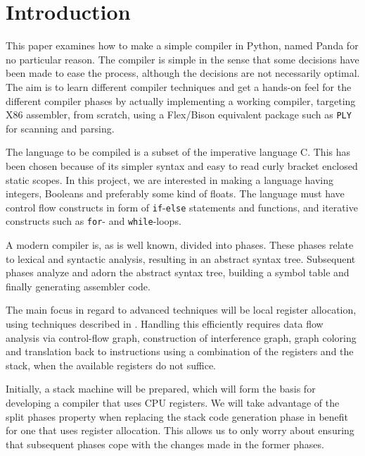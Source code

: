 { \hypersetup{hidelinks} \tableofcontents }

\newpage
{}
\setcounter{page}{1}

\chapter{Introduction}
This paper examines how to make a simple compiler in Python, named Panda for no particular reason. The compiler is simple in the sense that some decisions have been made to ease the process, although the decisions are not necessarily optimal. The aim is to learn different compiler techniques and get a hands-on feel for the different compiler phases by actually implementing a working compiler, targeting X86 assembler, from scratch, using a Flex/Bison equivalent package such as \texttt{PLY} for scanning and parsing. 

The language to be compiled is a subset of the imperative language C. This has been chosen because of its simpler syntax and easy to read curly bracket enclosed static scopes. In this project, we are interested in making a language having integers, Booleans and preferably some kind of floats. The language must have control flow constructs in form of \texttt{if}-\texttt{else} statements and functions, and iterative constructs such as \texttt{for}- and \texttt{while}-loops. 

A modern compiler is, as is well known, divided into phases. These phases relate to lexical and syntactic analysis, resulting in an abstract syntax tree. Subsequent phases analyze and adorn the abstract syntax tree, building a symbol table and finally generating assembler code.

The main focus in regard to advanced techniques will be local register allocation, using techniques described in \cite{ModernCompilerImplementation}. Handling this efficiently requires data flow analysis via control-flow graph, construction of interference graph, graph coloring and translation back to instructions using a combination of the registers and the stack, when the available registers do not suffice.

Initially, a stack machine will be prepared, which will form the basis for developing a compiler that uses CPU registers. We will take advantage of the split phases property when replacing the stack code generation phase in benefit for one that uses register allocation. This allows us to only worry about ensuring that subsequent phases cope with the changes made in the former phases.

